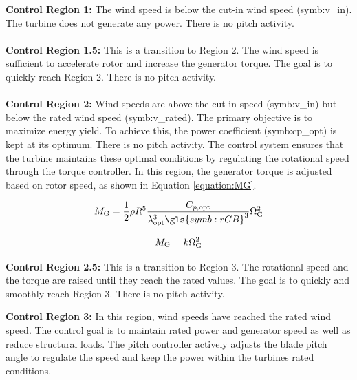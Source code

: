 \textbf{Control Region 1:} The wind speed is below the cut-in wind speed (\gls{symb:v_in}). 
The turbine does not generate any power.
There is no pitch activity.
\\
\\
\textbf{Control Region 1.5:} This is a transition to Region 2.
The wind speed is sufficient to accelerate rotor and increase the generator torque.
The goal is to quickly reach Region 2.
There is no pitch activity.
\\
\\
\textbf{Control Region 2:} Wind speeds are above the cut-in speed (\gls{symb:v_in}) but below the rated wind speed (\gls{symb:v_rated}). 
The primary objective is to maximize energy yield.
To achieve this, the power coefficient (\gls{symb:cp_opt}) is kept at its optimum. 
There is no pitch activity.
The control system ensures that the turbine maintains these optimal conditions by regulating the rotational speed through the torque controller.
In this region, the generator torque is adjusted based on rotor speed, as shown in Equation \ref{equation:MG}.

\begin{equation}
	M_{\textnormal{G}} = \frac{1}{2} \rho R^5 \frac{C_{p,\textnormal{opt}}}{{\lambda_{\textnormal{opt}}^3 \gls{symb:rGB}^3}} \Omega_{\textnormal{G}}^2
	\label{equation:MG}
\end{equation}

\begin{equation}
	M_{\textnormal{G}} = k\Omega_{\textnormal{G}}^2
	\label{equation:MG_2}
\end{equation}

\textbf{Control Region 2.5:} This is a transition to Region 3.
The rotational speed and the torque are raised until they reach the rated values. 
The goal is to quickly and smoothly reach Region 3.
There is no pitch activity.

\textbf{Control Region 3:} 
In this region, wind speeds have reached the rated wind speed.
The control goal is to maintain rated power and generator speed as well as reduce structural loads.
The pitch controller actively adjusts the blade pitch angle to regulate the speed and keep the power within the turbines rated conditions.

